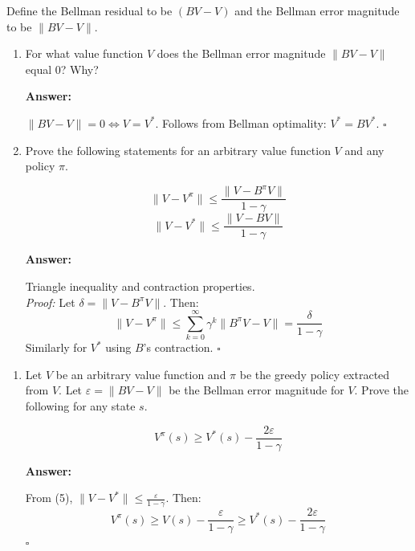 \documentclass[12pt]{article}
\begin{document}
{{Define the Bellman residual to be $(BV - V)$ and the Bellman error magnitude to be $\|BV - V\|$.

\begin{enumerate}[resume*]
    \item For what value function $V$ does the Bellman error magnitude $\|BV - V\|$ equal 0? Why?    


    \textbf{Answer:}
    
    \(\|BV - V\| = 0 \iff V = V^*\). Follows from Bellman optimality: \(V^* = BV^*\). \(\square\)


    \item Prove the following statements for an arbitrary value function $V$ and any policy $\pi$. 
    
    \[
    \|V - V^{\pi}\| \leq \frac{\|V - B^{\pi}V\|}{1 - \gamma}\] \[
    \|V - V^{\ast}\| \leq \frac{\|V - BV\|}{1 - \gamma}
    \]


    \textbf{Answer:}
    
    Triangle inequality and contraction properties. \\
    \textit{Proof:} Let \(\delta = \|V - B^\pi V\|\). Then:
    \[
    \|V - V^\pi\| \leq \sum_{k=0}^\infty \gamma^k \|B^\pi V - V\| = \frac{\delta}{1-\gamma}
    \]
    Similarly for \(V^*\) using \(B\)'s contraction. \(\square\)


    \end{enumerate}

\begin{enumerate}[resume*]
    \item Let $V$ be an arbitrary value function and $\pi$ be the greedy policy extracted from $V$. Let $\varepsilon = \|BV - V\|$ be the Bellman error magnitude for $V$. Prove the following for any state $s$. 
    
    \[
    V^{\pi}(s) \geq V^{\ast}(s) - \frac{2\varepsilon}{1 - \gamma}
    \]


    \textbf{Answer:} 

    From (5), \(\|V - V^*\| \leq \frac{\varepsilon}{1-\gamma}\). Then:
    \[
    V^\pi(s) \geq V(s) - \frac{\varepsilon}{1-\gamma} \geq V^*(s) - \frac{2\varepsilon}{1-\gamma}
    \]
    \(\square\)


\end{enumerate}}}
\end{document}
